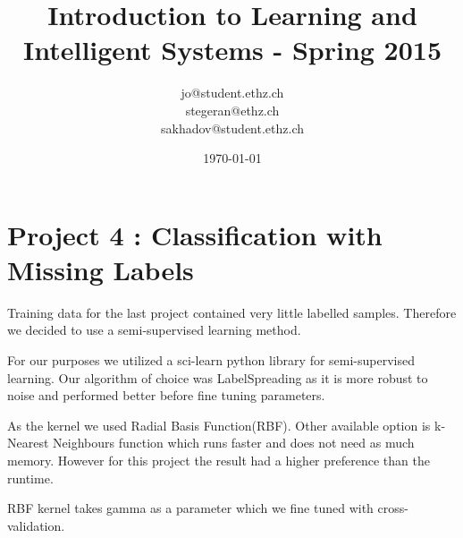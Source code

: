 \documentclass[a4paper, 11pt]{article}
\title{Introduction to Learning and Intelligent Systems - Spring 2015}
\author{jo@student.ethz.ch\\ stegeran@ethz.ch\\sakhadov@student.ethz.ch}
\date{\today}
\begin{document}
\maketitle

\section*{Project 4 : Classification with Missing Labels}

Training data for the last project contained very little labelled samples. Therefore we decided to use a semi-supervised learning method.

For our purposes we utilized a sci-learn python library for semi-supervised learning. Our algorithm of choice was LabelSpreading as it is more robust to noise and performed better before fine tuning parameters.

As the kernel we used Radial Basis Function(RBF). Other available option is k-Nearest Neighbours function which runs faster and does not need as much memory. However for this project the result had a higher preference than the runtime.

RBF kernel takes gamma as a parameter which we fine tuned with cross-validation.
\end{document}
